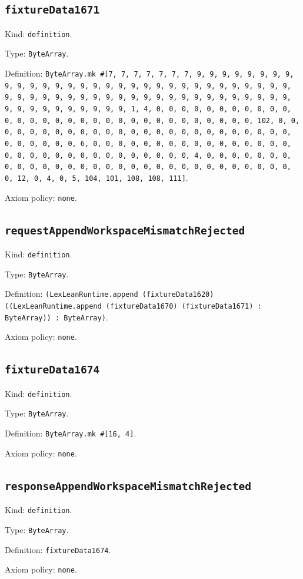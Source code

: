 \documentclass[11pt]{article}
\begin{document}
\subsection*{\texttt{fixtureData1671}}
\noindent Kind: \texttt{definition}.\par
\noindent Type: \texttt{ByteArray}.\par
\noindent Definition: \texttt{ByteArray.mk \#[7, 7, 7, 7, 7, 7, 7, 9, 9, 9, 9, 9, 9, 9, 9, 9, 9, 9, 9, 9, 9, 9, 9, 9, 9, 9, 9, 9, 9, 9, 9, 9, 9, 9, 9, 9, 9, 9, 9, 9, 9, 9, 9, 9, 9, 9, 9, 9, 9, 9, 9, 9, 9, 9, 9, 9, 9, 9, 9, 9, 9, 9, 9, 9, 9, 9, 9, 9, 9, 9, 9, 1, 4, 0, 0, 0, 0, 0, 0, 0, 0, 0, 0, 0, 0, 0, 0, 0, 0, 0, 0, 0, 0, 0, 0, 0, 0, 0, 0, 0, 0, 0, 0, 0, 102, 0, 0, 0, 0, 0, 0, 0, 0, 0, 0, 0, 0, 0, 0, 0, 0, 0, 0, 0, 0, 0, 0, 0, 0, 0, 0, 0, 0, 0, 0, 0, 6, 0, 0, 0, 0, 0, 0, 0, 0, 0, 0, 0, 0, 0, 0, 0, 0, 0, 0, 0, 0, 0, 0, 0, 0, 0, 0, 0, 0, 0, 0, 0, 4, 0, 0, 0, 0, 0, 0, 0, 0, 0, 0, 0, 0, 0, 0, 0, 0, 0, 0, 0, 0, 0, 0, 0, 0, 0, 0, 0, 0, 0, 0, 0, 12, 0, 4, 0, 5, 104, 101, 108, 108, 111]}.\par
\noindent Axiom policy: \texttt{none}.\par
\subsection*{\texttt{requestAppendWorkspaceMismatchRejected}}
\noindent Kind: \texttt{definition}.\par
\noindent Type: \texttt{ByteArray}.\par
\noindent Definition: \texttt{(LexLeanRuntime.append (fixtureData1620) ((LexLeanRuntime.append (fixtureData1670) (fixtureData1671) : ByteArray)) : ByteArray)}.\par
\noindent Axiom policy: \texttt{none}.\par
\subsection*{\texttt{fixtureData1674}}
\noindent Kind: \texttt{definition}.\par
\noindent Type: \texttt{ByteArray}.\par
\noindent Definition: \texttt{ByteArray.mk \#[16, 4]}.\par
\noindent Axiom policy: \texttt{none}.\par
\subsection*{\texttt{responseAppendWorkspaceMismatchRejected}}
\noindent Kind: \texttt{definition}.\par
\noindent Type: \texttt{ByteArray}.\par
\noindent Definition: \texttt{fixtureData1674}.\par
\noindent Axiom policy: \texttt{none}.\par
\end{document}
